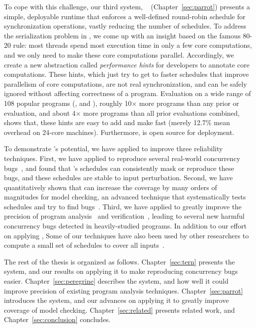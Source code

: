 To cope with this challenge, our third \smt system, \parrot~\cite{parrot:sosp13}
(Chapter~\ref{sec:parrot}) presents a simple, deployable runtime that enforces a
well-defined round-robin schedule for synchronization operations, vastly
reducing the number of schedules. To address the serialization problem in \smt,
we come up with an insight based on the famous 80-20 rule: most threads spend
most execution time in only a few core computations, and we only need to make 
these core computations parallel. Accordingly, we create a new abstraction
called \emph{performance hints} for developers to annotate core computations.
These hints, which just try to get to faster schedules that improve parallelism
of core computations, are not real synchronization, and can be safely ignored
without affecting correctness of a program. Evaluation on a wide range of 108
popular programs (\eg, \bdb and \mplayer), roughly 10$\times$ more programs than
any prior \smt or \dmt evaluation, and about 4$\times$ more programs than all
prior evaluations combined, shows that, these hints are easy to add and make
\parrot fast (merely 12.7\% mean overhead on 24-core machines). Furthermore,
\parrot is open source for deployment.


To demonstrate \smt's potential, we have applied \smt to improve three
reliability techniques. First, we have applied \smt to reproduce several
real-world concurrency bugs~\cite{cui:tern:osdi10}, and found that \smt's
schedules can consistently mask or reproduce these bugs, and these schedules are
stable to input perturbation. Second, we have quantitatively shown that \smt can
increase the coverage by many orders of magnitudes for model checking, an
advanced technique that systematically tests schedules and try to find
bugs~\cite{parrot:sosp13, dbug:spin11, modist:nsdi09}. Third, we have applied
\smt to greatly improve the precision of program analysis~\cite{wu:pldi12} and
verification~\cite{wu:pldi12}, leading to several new harmful concurrency bugs
detected in heavily-studied programs. In addition to our effort on applying
\smt, Some of our \smt techniques have also been used by other researchers to
compute a small set of schedules to cover all inputs~\cite{bergan:oopsla13}.

The rest of the thesis is organized as follows. Chapter~\ref{sec:tern} presents
the \tern system, and our results on applying it to make reproducing concurrency
bugs easier. Chapter~\ref{sec:peregrine} describes the \peregrine system, and
how well it could improve precision of existing program analysis techniques.
Chapter~\ref{sec:parrot} introduces the \parrot system, and our advances on
applying it to greatly improve coverage of model checking.
Chapter~\ref{sec:related} presents related work, and
Chapter~\ref{sec:conclusion} concludes.



